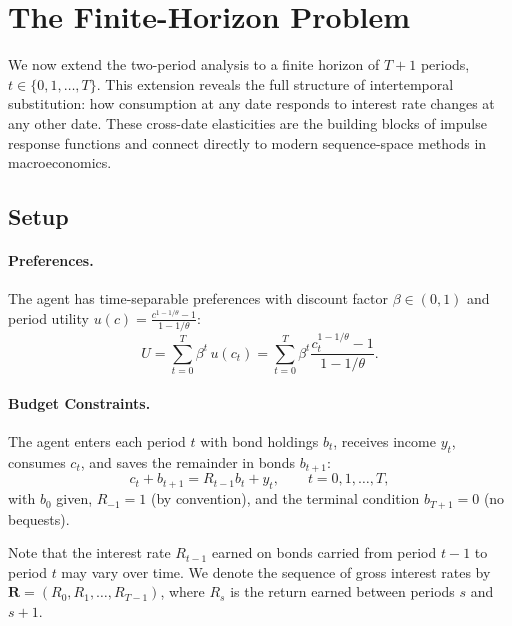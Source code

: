 \section{The Finite-Horizon Problem}
\label{sec:T-period}

We now extend the two-period analysis to a finite horizon of $T+1$ periods, $t \in \{0, 1, \ldots, T\}$. This extension reveals the full structure of intertemporal substitution: how consumption at any date responds to interest rate changes at any other date. These cross-date elasticities are the building blocks of impulse response functions and connect directly to modern sequence-space methods in macroeconomics.

\subsection{Setup}
\label{subsec:T-setup}

\paragraph{Preferences.}
The agent has time-separable preferences with discount factor $\beta \in (0,1)$ and period utility $u(c) = \frac{c^{1-1/\theta} - 1}{1 - 1/\theta}$:
\begin{equation}
U = \sum_{t=0}^{T} \beta^t \, u(c_t) = \sum_{t=0}^{T} \beta^t \frac{c_t^{1-1/\theta} - 1}{1 - 1/\theta}.
\label{eq:U-T-period}
\end{equation}

\paragraph{Budget Constraints.}
The agent enters each period $t$ with bond holdings $b_t$, receives income $y_t$, consumes $c_t$, and saves the remainder in bonds $b_{t+1}$:
\begin{equation}
c_t + b_{t+1} = R_{t-1} b_t + y_t, \qquad t = 0, 1, \ldots, T,
\label{eq:budget-sequential-T}
\end{equation}
with $b_0$ given, $R_{-1} = 1$ (by convention), and the terminal condition $b_{T+1} = 0$ (no bequests).

Note that the interest rate $R_{t-1}$ earned on bonds carried from period $t-1$ to period $t$ may vary over time. We denote the sequence of gross interest rates by $\mathbf{R} = (R_0, R_1, \ldots, R_{T-1})$, where $R_s$ is the return earned between periods $s$ and $s+1$.

